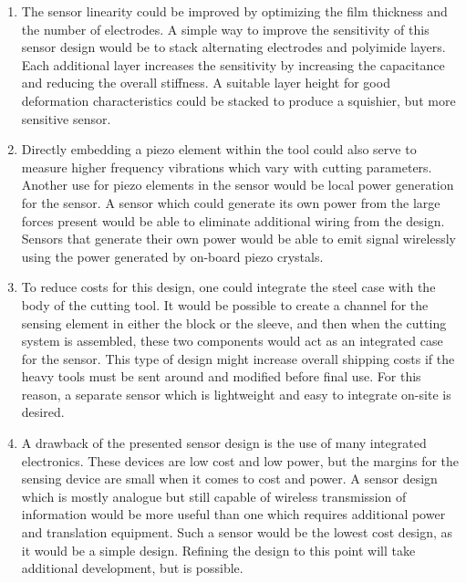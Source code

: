 \begin{enumerate}

\item The sensor linearity could be improved by optimizing the film thickness and the number of electrodes.
A simple way to improve the sensitivity of this sensor design would be to stack alternating electrodes and polyimide layers.
Each additional layer increases the sensitivity by increasing the capacitance and reducing the overall stiffness.
A suitable layer height for good deformation characteristics could be stacked to produce a squishier, but more sensitive sensor.

\item Directly embedding a piezo element within the tool could
also serve to measure higher frequency vibrations which vary with cutting parameters.
Another use for piezo elements in the sensor would be local power generation for the sensor. 
A sensor which could generate its own power from the large forces present would be able to 
eliminate additional wiring from the design. Sensors that generate their own power would be able to 
emit signal wirelessly using the power generated by on-board piezo crystals.

\item To reduce costs for this design, one could integrate the steel case with the body of the cutting tool.
It would be possible to create a channel for the sensing element in either the block or the sleeve, and then
when the cutting system is assembled, these two components would act as an integrated case for the sensor.
This type of design might increase overall shipping costs if the heavy tools must be sent around and modified before final use.
For this reason, a separate sensor which is lightweight and easy to integrate on-site is desired.

\item A drawback of the presented sensor design is the use of many integrated electronics. These devices are low cost and low power,
but the margins for the sensing device are small when it comes to cost and power. A sensor design which is mostly analogue but
still capable of wireless transmission of information would be more useful than one which requires additional power
and translation equipment. Such a sensor would be the lowest cost design, as it would be a simple design.
Refining the design to this point will take additional development, but is possible.

\end{enumerate}

